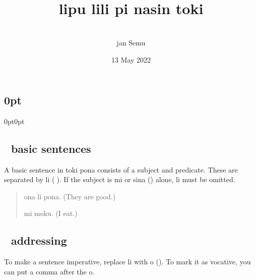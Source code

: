 \documentclass[statementpaper,oneside,article,14pt]{memoir}
\newcommand{\BackgroundPic}[1]{%
\put(0,0){%
\parbox[b][\paperheight]{\paperwidth}{%
\vfill
\centering
{\transparent{0.4} \texttt{[image: \#1]}}%
\vfill
}}}
\begin{document}
\titlespacing\subsection{0pt}{0pt}{0pt}

\newcommand{\nimi}[3]{\item[{\sitpon#1} #2] #3}


\title{{} \\ lipu lili pi nasin toki}
\author{{\sitpon󱤑󱦐󱥚󱦜󱤻󱦜󱦑} \\ jan Semu}
\date{13 May 2022}

\begingroup
\let\cleardoublepage\clearpage


\begin{titlingpage}
\maketitle


\end{titlingpage}

\endgroup

\pagestyle{empty}



\subsection{{\sitpon󱤧} basic sentences}

\noindent A basic sentence in toki pona consists of a subject and predicate. These are separated by li ({\sitpon󱤧}).
If the subject is mi or sina ({}) alone, li must be omitted.

\begin{quote}
  ona li pona. (They are good.)

  mi moku. (I eat.)
\end{quote}

\subsection{{\sitpon󱥄} addressing}

\noindent To make a sentence imperative, replace li with o ({}). To mark it as vocative, you can put a comma after the o.
\end{document}
